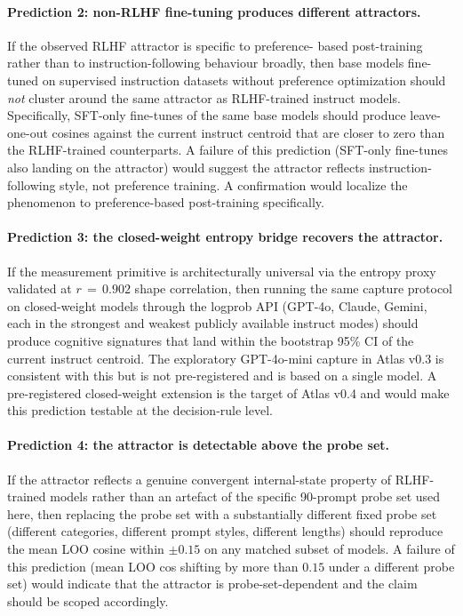 \documentclass[11pt,letterpaper]{article}
\begin{document}
\paragraph{Prediction 2: non-RLHF fine-tuning produces different
attractors.} If the observed RLHF attractor is specific to preference-
based post-training rather than to instruction-following behaviour
broadly, then base models fine-tuned on supervised instruction datasets
without preference optimization should \emph{not} cluster around the
same attractor as RLHF-trained instruct models. Specifically, SFT-only
fine-tunes of the same base models should produce leave-one-out cosines
against the current instruct centroid that are closer to zero than the
RLHF-trained counterparts. A failure of this prediction (SFT-only
fine-tunes also landing on the attractor) would suggest the attractor
reflects instruction-following style, not preference training. A
confirmation would localize the phenomenon to preference-based
post-training specifically.

\paragraph{Prediction 3: the closed-weight entropy bridge recovers the
attractor.} If the measurement primitive is architecturally universal
via the entropy proxy validated at $r\,=\,0.902$ shape correlation, then
running the same capture protocol on closed-weight models through the
logprob API (GPT-4o, Claude, Gemini, each in the strongest and weakest
publicly available instruct modes) should produce cognitive signatures
that land within the bootstrap 95\% CI of the current instruct centroid.
The exploratory GPT-4o-mini capture in Atlas v0.3 is consistent with this
but is not pre-registered and is based on a single model. A pre-registered
closed-weight extension is the target of Atlas v0.4 and would make this
prediction testable at the decision-rule level.

\paragraph{Prediction 4: the attractor is detectable above the probe
set.} If the attractor reflects a genuine convergent internal-state
property of RLHF-trained models rather than an artefact of the specific
90-prompt probe set used here, then replacing the probe set with a
substantially different fixed probe set (different categories, different
prompt styles, different lengths) should reproduce the mean LOO cosine
within $\pm 0.15$ on any matched subset of models. A failure of this
prediction (mean LOO cos shifting by more than $0.15$ under a different
probe set) would indicate that the attractor is probe-set-dependent and
the claim should be scoped accordingly.
\end{document}
